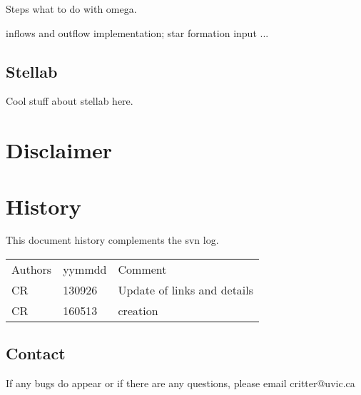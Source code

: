 Steps what to do with omega.


inflows and outflow implementation;
star formation input ...

\subsection{Stellab}

Cool stuff about stellab here.

\section{Disclaimer}

		
\section{History} 
This document history complements the svn log.

\begin{tabular*}{\textwidth}{lll}
\hline
Authors & yymmdd & Comment \\
CR & 130926 & Update of links and details \\
\hline
CR & 160513 & creation \\
\end{tabular*}


\subsection{Contact}
If any bugs do appear or if there are any questions, please email critter@uvic.ca
\begin{verbatim}

\end{verbatim}


%
%
%
%



